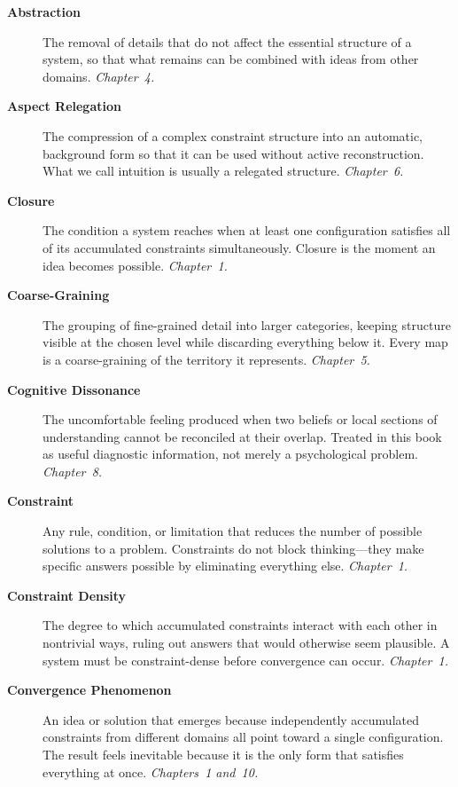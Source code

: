 \documentclass[11pt]{book}
\theoremstyle{definition}
\theoremstyle{remark}
\begin{document}
\begin{description}

\item[\textbf{Abstraction}] The removal of details that do not affect
the essential structure of a system, so that what remains can be
combined with ideas from other domains. \textit{Chapter~4.}

\item[\textbf{Aspect Relegation}] The compression of a complex
constraint structure into an automatic, background form so that it can
be used without active reconstruction. What we call intuition is usually
a relegated structure. \textit{Chapter~6.}

\item[\textbf{Closure}] The condition a system reaches when at least
one configuration satisfies all of its accumulated constraints
simultaneously. Closure is the moment an idea becomes possible.
\textit{Chapter~1.}

\item[\textbf{Coarse-Graining}] The grouping of fine-grained detail
into larger categories, keeping structure visible at the chosen level
while discarding everything below it. Every map is a coarse-graining
of the territory it represents. \textit{Chapter~5.}

\item[\textbf{Cognitive Dissonance}] The uncomfortable feeling produced
when two beliefs or local sections of understanding cannot be reconciled
at their overlap. Treated in this book as useful diagnostic information,
not merely a psychological problem. \textit{Chapter~8.}

\item[\textbf{Constraint}] Any rule, condition, or limitation that
reduces the number of possible solutions to a problem. Constraints do
not block thinking---they make specific answers possible by eliminating
everything else. \textit{Chapter~1.}

\item[\textbf{Constraint Density}] The degree to which accumulated
constraints interact with each other in nontrivial ways, ruling out
answers that would otherwise seem plausible. A system must be
constraint-dense before convergence can occur. \textit{Chapter~1.}

\item[\textbf{Convergence Phenomenon}] An idea or solution that emerges
because independently accumulated constraints from different domains
all point toward a single configuration. The result feels inevitable
because it is the only form that satisfies everything at once.
\textit{Chapters~1 and~10.}


\end{description}
\end{document}
